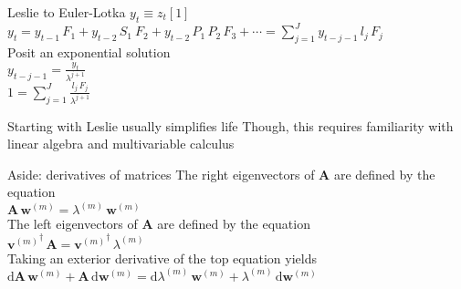\documentclass{beamer}
\begin{document}
\begin{frame}{Leslie to Euler-Lotka}
  $y_t \equiv z_t[1]$\\
  \vspace{.5cm}
  $y_t = y_{t-1} \, F_1 + y_{t-2} \, S_1 \ F_2 + y_{t-2} \, P_1 \, P_2 \, F_3 + \cdots = \displaystyle\sum\limits_{j=1}^{J} y_{t-j-1} \, l_j \, F_j$\\
  \vspace{.5cm}
  Posit an exponential solution\\
  \vspace{.5cm}
  $y_{t-j-1} = \frac{y_t}{\lambda^{j+1}}$\\
  \vspace{.5cm}
  $1 = \displaystyle\sum\limits_{j=1}^{J} \frac{l_j \, F_j}{\lambda^{j+1}}$\\
\end{frame}

\begin{frame}{Starting with Leslie usually simplifies life}
  Though, this requires familiarity with linear algebra and multivariable calculus
\end{frame}

\begin{frame}{Aside: derivatives of matrices}
  The right eigenvectors of $\mathbf{A}$ are defined by the equation\\
  \vspace{.5cm}
  $\mathbf{A} \, \mathbf{w}^{(m)} = \lambda^{(m)} \, \mathbf{w}^{(m)}$\\
  \vspace{.5cm}
  The left eigenvectors of $\mathbf{A}$ are defined by the equation\\
  ${\mathbf{v}^{(m)}}^{\dagger} \, \mathbf{A} =	{\mathbf{v}^{(m)}}^{\dagger} \, \lambda^{(m)}$\\
  \vspace{.5cm}
  Taking an exterior derivative of the top equation yields\\
  \vspace{.5cm}
  $\mathrm{d}\mathbf{A} \, \mathbf{w}^{(m)} + \mathbf{A} \, \mathrm{d}\mathbf{w}^{(m)}= \mathrm{d}\lambda^{(m)} \, \mathbf{w}^{(m)} + \lambda^{(m)} \, \mathrm{d}\mathbf{w}^{(m)}$\\
\end{frame}
\end{document}
